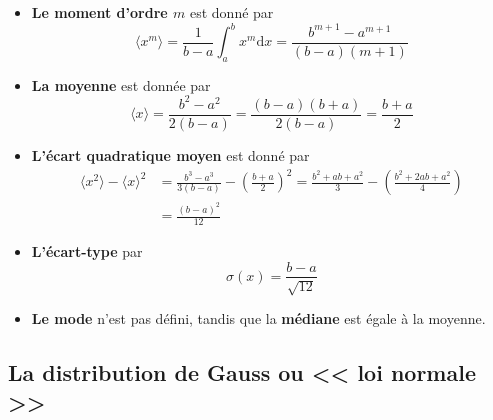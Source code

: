 \begin{itemize}\itemsep1pt
\renewcommand{\labelitemi}{$\bullet$}
\item \textbf{Le moment d'ordre $m$} est donné par
\begin{equation}
\langle x^m\rangle=\frac{1}{b-a}\int_a^b x^m\text{d}x=
\frac{b^{m+1}-a^{m+1}}{(b-a)(m+1)}
\end{equation}
\item \textbf{La moyenne} est donnée par
\begin{equation}
\langle x\rangle=\frac{b^2-a^2}{2(b-a)}=\frac{(b-a)(b+a)}{2(b-a)}=\frac{b+a}{2}
\end{equation}
\item \textbf{L'écart quadratique moyen} est donné par
\begin{align}
\langle x^2\rangle-\langle x\rangle^2&=\frac{b^3-a^3}{3(b-a)}-\left(\frac{b+a}{2}\right)^2=\frac{b^2+ab+a^2}{3}-\left(\frac{b^2+2ab+a^2}{4}\right)\nonumber\\
&=\frac{(b-a)^2}{12}
\end{align}
\item \textbf{L'écart-type} par
\begin{equation}
\sigma(x)=\frac{b-a}{\sqrt{12}}
\end{equation}
\item \textbf{Le mode} n'est pas défini, tandis que la \textbf{médiane} est égale à la moyenne.
\end{itemize}

\subsection{La distribution de Gauss ou << loi normale >>}

